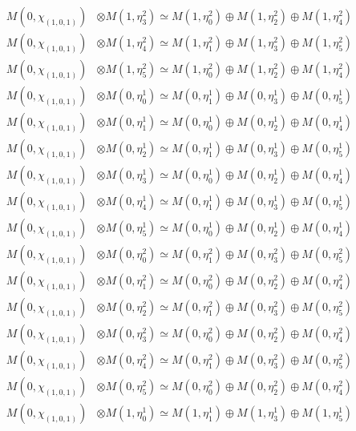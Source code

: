 \begin{align*}
M(0,\chi_{(1,0,1)}) &\otimes M(1,\eta^{2}_{3}) \simeq M(1,\eta^{2}_{0}) \oplus M(1,\eta^{2}_{2}) \oplus M(1,\eta^{2}_{4}) \\
M(0,\chi_{(1,0,1)}) &\otimes M(1,\eta^{2}_{4}) \simeq M(1,\eta^{2}_{1}) \oplus M(1,\eta^{2}_{3}) \oplus M(1,\eta^{2}_{5}) \\
M(0,\chi_{(1,0,1)}) &\otimes M(1,\eta^{2}_{5}) \simeq M(1,\eta^{2}_{0}) \oplus M(1,\eta^{2}_{2}) \oplus M(1,\eta^{2}_{4}) \\
M(0,\chi_{(1,0,1)}) &\otimes M(0,\eta^{1}_{0}) \simeq M(0,\eta^{1}_{1}) \oplus M(0,\eta^{1}_{3}) \oplus M(0,\eta^{1}_{5}) \\
M(0,\chi_{(1,0,1)}) &\otimes M(0,\eta^{1}_{1}) \simeq M(0,\eta^{1}_{0}) \oplus M(0,\eta^{1}_{2}) \oplus M(0,\eta^{1}_{4}) \\
M(0,\chi_{(1,0,1)}) &\otimes M(0,\eta^{1}_{2}) \simeq M(0,\eta^{1}_{1}) \oplus M(0,\eta^{1}_{3}) \oplus M(0,\eta^{1}_{5}) \\
M(0,\chi_{(1,0,1)}) &\otimes M(0,\eta^{1}_{3}) \simeq M(0,\eta^{1}_{0}) \oplus M(0,\eta^{1}_{2}) \oplus M(0,\eta^{1}_{4}) \\
M(0,\chi_{(1,0,1)}) &\otimes M(0,\eta^{1}_{4}) \simeq M(0,\eta^{1}_{1}) \oplus M(0,\eta^{1}_{3}) \oplus M(0,\eta^{1}_{5}) \\
M(0,\chi_{(1,0,1)}) &\otimes M(0,\eta^{1}_{5}) \simeq M(0,\eta^{1}_{0}) \oplus M(0,\eta^{1}_{2}) \oplus M(0,\eta^{1}_{4}) \\
M(0,\chi_{(1,0,1)}) &\otimes M(0,\eta^{2}_{0}) \simeq M(0,\eta^{2}_{1}) \oplus M(0,\eta^{2}_{3}) \oplus M(0,\eta^{2}_{5}) \\
M(0,\chi_{(1,0,1)}) &\otimes M(0,\eta^{2}_{1}) \simeq M(0,\eta^{2}_{0}) \oplus M(0,\eta^{2}_{2}) \oplus M(0,\eta^{2}_{4}) \\
M(0,\chi_{(1,0,1)}) &\otimes M(0,\eta^{2}_{2}) \simeq M(0,\eta^{2}_{1}) \oplus M(0,\eta^{2}_{3}) \oplus M(0,\eta^{2}_{5}) \\
M(0,\chi_{(1,0,1)}) &\otimes M(0,\eta^{2}_{3}) \simeq M(0,\eta^{2}_{0}) \oplus M(0,\eta^{2}_{2}) \oplus M(0,\eta^{2}_{4}) \\
M(0,\chi_{(1,0,1)}) &\otimes M(0,\eta^{2}_{4}) \simeq M(0,\eta^{2}_{1}) \oplus M(0,\eta^{2}_{3}) \oplus M(0,\eta^{2}_{5}) \\
M(0,\chi_{(1,0,1)}) &\otimes M(0,\eta^{2}_{5}) \simeq M(0,\eta^{2}_{0}) \oplus M(0,\eta^{2}_{2}) \oplus M(0,\eta^{2}_{4}) \\
M(0,\chi_{(1,0,1)}) &\otimes M(1,\eta^{1}_{0}) \simeq M(1,\eta^{1}_{1}) \oplus M(1,\eta^{1}_{3}) \oplus M(1,\eta^{1}_{5}) \\

\end{align*}
